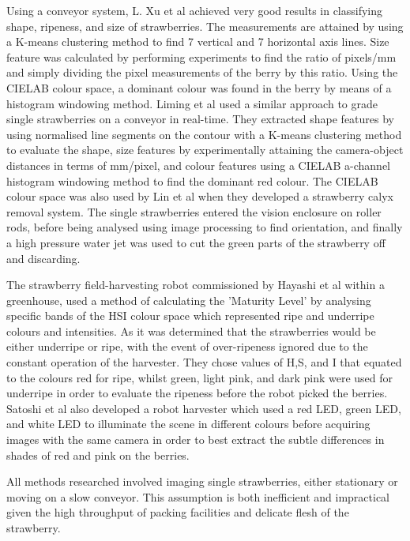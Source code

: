 \documentclass[conference]{IEEEtran}
\begin{document}
Using a conveyor system, L. Xu et al \cite{xu} achieved very good results in classifying shape, ripeness, and size of strawberries. The measurements are attained by using a K-means clustering method to find 7 vertical and 7 horizontal axis lines. Size feature was calculated by performing experiments to find the ratio of pixels/mm and simply dividing the pixel measurements of the berry by this ratio. Using the CIELAB colour space, a dominant colour was found in the berry by means of a histogram windowing method. Liming et al \cite{liming} used a similar approach to grade single strawberries on a conveyor in real-time. They extracted shape features by using normalised line segments on the contour with a K-means clustering method to evaluate the shape, size features by experimentally attaining the camera-object distances in terms of mm/pixel, and colour features using a CIELAB a-channel histogram windowing method to find the dominant red colour. The CIELAB colour space was also used by Lin et al \cite{lin} when they developed a strawberry calyx removal system. The single strawberries entered the vision enclosure on roller rods, before being analysed using image processing to find orientation, and finally a high pressure water jet was used to cut the green parts of the strawberry off and discarding.


The strawberry field-harvesting robot commissioned by Hayashi et al \cite{hayashi} within a greenhouse, used a method of calculating the 'Maturity Level' by analysing specific bands of the HSI colour space which represented ripe and underripe colours and intensities. As it was determined that the strawberries would be either underripe or ripe, with the event of over-ripeness ignored due to the constant operation of the harvester. They chose values of H,S, and I that equated to the colours red for ripe, whilst green, light pink, and dark pink were used for underripe in order to evaluate the ripeness before the robot picked the berries. Satoshi et al \cite{satoshi} also developed a robot harvester which used a red LED, green LED, and white LED to illuminate the scene in different colours before acquiring images with the same camera in order to best extract the subtle differences in shades of red and pink on the berries. 

All methods researched involved imaging single strawberries, either stationary or moving on a slow conveyor. This assumption is both inefficient and impractical given the high throughput of packing facilities and delicate flesh of the strawberry.
\end{document}
